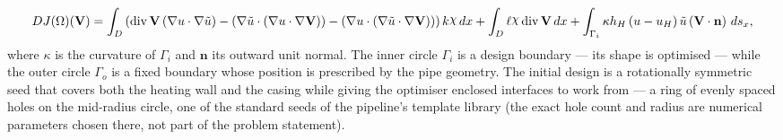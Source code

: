 \documentclass[preview]{standalone}
\let\oldcdot\cdot
\let\cdot\oldcdot
\begin{document}
\begin{dmath*}
DJ(\Omega)(\mathbf V) = \int_{D} \left(\operatorname{div} {\mathbf V} \left(  \nabla u  \cdot  \nabla \tilde u  \right) - \left(  \nabla \tilde u  \cdot \left(  \nabla u  \cdot  \nabla {\mathbf V}  \right) \right) - \left(  \nabla u  \cdot \left(  \nabla \tilde u  \cdot  \nabla {\mathbf V}  \right) \right)\right) k \raisebox{\depth}{$\chi$} \,dx + \int_{D} \ell \raisebox{\depth}{$\chi$} \operatorname{div} {\mathbf V} \,dx + \int_{\Gamma_i} \kappa h_H \left( u - u_{H}\right) \tilde u \left(\mathbf V \cdot \mathbf n\right) \,ds_x ,
\end{dmath*}
where $\kappa$ is the curvature of $\Gamma_i$ and $\mathbf n$ its outward unit normal.  The inner circle $\Gamma_i$ is a design boundary — its shape is optimised — while the outer circle $\Gamma_o$ is a fixed boundary whose position is prescribed by the pipe geometry.
The initial design is a rotationally symmetric seed that covers both the heating wall and the casing while giving the optimiser enclosed interfaces to work from — a ring of evenly spaced holes on the mid-radius circle, one of the standard seeds of the pipeline's template library (the exact hole count and radius are numerical parameters chosen there, not part of the problem statement).
\end{document}
